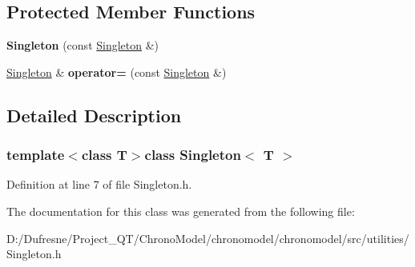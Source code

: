 \subsection*{Protected Member Functions}
\begin{DoxyCompactItemize}
\item 
\hypertarget{class_singleton_a363d3f7d5276e6ee74966d9606df2086}{{\bfseries Singleton} (const \hyperlink{class_singleton}{Singleton} \&)}\label{class_singleton_a363d3f7d5276e6ee74966d9606df2086}

\item 
\hypertarget{class_singleton_a90761b9486d76162ab59c871b5cc030f}{\hyperlink{class_singleton}{Singleton} \& {\bfseries operator=} (const \hyperlink{class_singleton}{Singleton} \&)}\label{class_singleton_a90761b9486d76162ab59c871b5cc030f}

\end{DoxyCompactItemize}


\subsection{Detailed Description}
\subsubsection*{template$<$class T$>$class Singleton$<$ T $>$}



Definition at line 7 of file Singleton.\-h.



The documentation for this class was generated from the following file\-:\begin{DoxyCompactItemize}
\item 
D\-:/\-Dufresne/\-Project\-\_\-\-Q\-T/\-Chrono\-Model/chronomodel/chronomodel/src/utilities/Singleton.\-h\end{DoxyCompactItemize}
